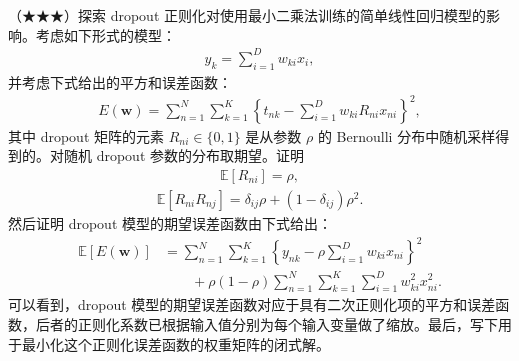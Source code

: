 \documentclass[../../main.tex]{subfiles}
\begin{document}
\begin{exercise}\label{exercise:ch09-18}
（★★★）探索 dropout 正则化对使用最小二乘法训练的简单线性回归模型的影响。考虑如下形式的模型：
\begin{align}
y_{k}=\sum_{i=1}^{D}w_{ki}x_{i},
\label{align:ch09-dropout线性模型}
\end{align}
并考虑下式给出的平方和误差函数：
\begin{align}
E(\boldsymbol{w})=\sum_{n=1}^{N}\sum_{k=1}^{K}\left\{t_{nk}-\sum_{i=1}^{D}w_{ki}R_{ni}x_{ni}\right\}^{2},
\label{align:ch09-dropout误差}
\end{align}
其中 dropout 矩阵的元素 $R_{ni}\in\{0,1\}$ 是从参数 $\rho$ 的 Bernoulli 分布中随机采样得到的。对随机 dropout 参数的分布取期望。证明
\begin{align}
\mathbb{E}[R_{ni}]=\rho,
\label{align:ch09-dropout均值}
\end{align}
\begin{align}
\mathbb{E}[R_{ni}R_{nj}]=\delta_{ij}\rho+(1-\delta_{ij})\rho^{2}.
\label{align:ch09-dropout协方差}
\end{align}
然后证明 dropout 模型的期望误差函数由下式给出：
\begin{align}
\mathbb{E}[E(\boldsymbol{w})]
&=\sum_{n=1}^{N}\sum_{k=1}^{K}\left\{y_{nk}-\rho\sum_{i=1}^{D}w_{ki}x_{ni}\right\}^{2}\nonumber\\
&\qquad+\rho(1-\rho)\sum_{n=1}^{N}\sum_{k=1}^{K}\sum_{i=1}^{D}w_{ki}^{2}x_{ni}^{2}.
\label{align:ch09-dropout期望误差}
\end{align}
\enlargethispage{2\baselineskip}
可以看到，dropout 模型的期望误差函数对应于具有二次正则化项的平方和误差函数，后者的正则化系数已根据输入值分别为每个输入变量做了缩放。最后，写下用于最小化这个正则化误差函数的权重矩阵的闭式解。
\end{exercise}
\end{document}
